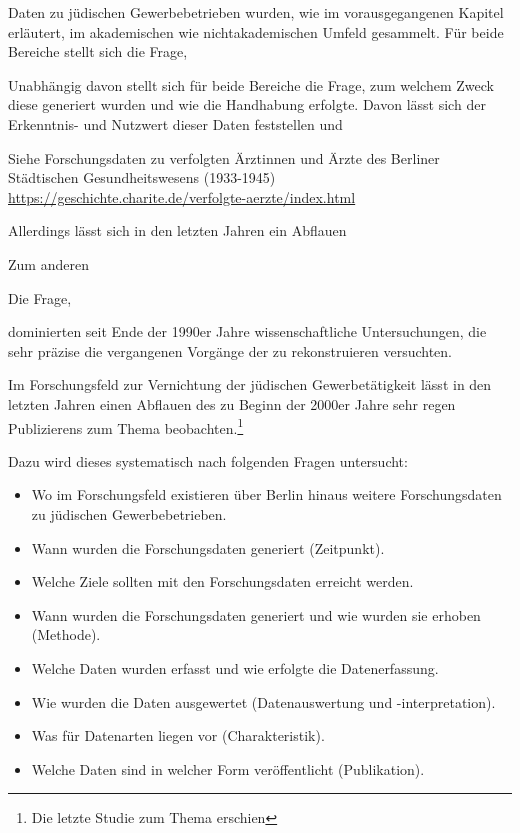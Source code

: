 Daten zu jüdischen Gewerbebetrieben wurden, wie im vorausgegangenen Kapitel erläutert, im akademischen wie nichtakademischen Umfeld gesammelt. Für beide Bereiche stellt sich die Frage, 

Unabhängig davon stellt sich für beide Bereiche die Frage, zum welchem Zweck diese generiert wurden und wie die Handhabung erfolgte. Davon lässt sich der Erkenntnis- und Nutzwert dieser Daten feststellen und 


Siehe Forschungsdaten zu verfolgten Ärztinnen und Ärzte des Berliner Städtischen Gesundheitswesens (1933-1945)
\url{https://geschichte.charite.de/verfolgte-aerzte/index.html}


Allerdings lässt sich in den letzten Jahren ein Abflauen

Zum anderen

Die Frage, 

 dominierten seit Ende der 1990er Jahre wissenschaftliche Untersuchungen, die sehr präzise die vergangenen Vorgänge der zu rekonstruieren versuchten.      


Im Forschungsfeld zur Vernichtung der jüdischen Gewerbetätigkeit lässt in den letzten Jahren einen Abflauen des zu Beginn der 2000er Jahre sehr regen Publizierens zum Thema beobachten.\footnote{Die letzte Studie zum Thema erschien}


Dazu wird dieses systematisch nach folgenden Fragen untersucht:

\begin{itemize}
\item Wo im Forschungsfeld existieren über Berlin hinaus weitere Forschungsdaten zu jüdischen Gewerbebetrieben.
\item Wann wurden die Forschungsdaten generiert (Zeitpunkt).
\item Welche Ziele sollten mit den Forschungsdaten erreicht werden.
\item Wann wurden die Forschungsdaten generiert und wie wurden sie erhoben (Methode). 
\item Welche Daten wurden erfasst und wie erfolgte die Datenerfassung.
\item Wie wurden die Daten ausgewertet (Datenauswertung und -interpretation).
\item Was für Datenarten liegen vor (Charakteristik).
\item Welche Daten sind in welcher Form veröffentlicht (Publikation).
\end{itemize}


